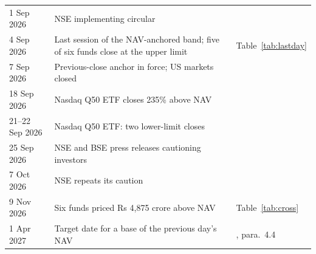 \begin{table}[!t]
\begin{tabularx}{\textwidth}{L{2.6cm}YL{3.3cm}}
1 Sep 2026 & NSE implementing circular & \citet{nse2026circular}\\
4 Sep 2026 & Last session of the NAV-anchored band; five of six funds close at the upper limit & Table~\ref{tab:lastday}\\
7 Sep 2026 & Previous-close anchor in force; US markets closed & \citet{nse2026files}\\
18 Sep 2026 & Nasdaq Q50 ETF closes 235\% above NAV & \citet{indmoney2026unwind}\\
21--22 Sep 2026 & Nasdaq Q50 ETF: two lower-limit closes & \citet{indmoney2026unwind}\\
25 Sep 2026 & NSE and BSE press releases cautioning investors & \citet{nse2026press,bse2026press}\\
7 Oct 2026 & NSE repeats its caution & \citet{reuters2026nse}\\
9 Nov 2026 & Six funds priced Rs 4,875 crore above NAV & Table~\ref{tab:cross}\\
1 Apr 2027 & Target date for a base of the previous day's NAV & \citet{sebi2026circular}, para.\ 4.4\\
\bottomrule
\end{tabularx}
\end{table}
